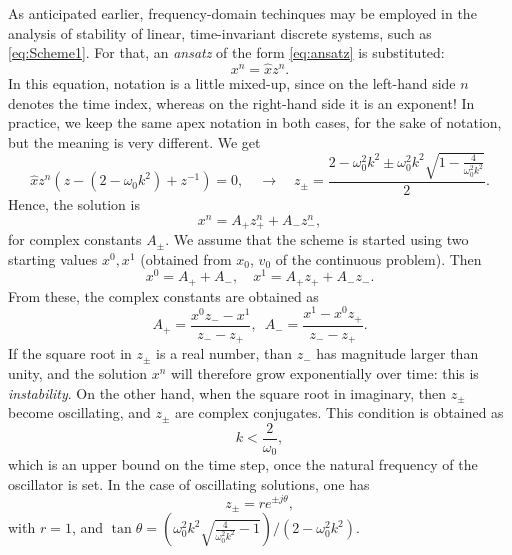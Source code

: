 As anticipated earlier, frequency-domain techinques may be employed in the analysis of stability of linear, time-invariant discrete systems, such as \eqref{eq:Scheme1}. For that, an \emph{ansatz} of the form \eqref{eq:ansatz} is substituted:
\begin{equation}
    x^n = \hat x z^{n}.
\end{equation}
In this equation, notation is a little mixed-up, since on the left-hand side $n$ denotes the time index, whereas on the right-hand side it is an exponent! In practice, we keep the same apex notation in both cases, for the sake of notation, but the meaning is very different. We get
\begin{equation}
    \hat x z^n\left( z - (2-\omega_0 k^2) + z^{-1}\right) = 0, \quad \rightarrow \quad z_{\pm} = \frac{2 - \omega_0^2 k^2 \pm \omega_0^2 k^2\sqrt{1 - \frac{4}{\omega_0^2 k^2}}}{2}.
\end{equation}
Hence, the solution is
\begin{equation}\label{eq:sol_z_SHO}
    x^n =  A_+ z^n_+ + A_- z^n_-,
\end{equation}
for complex constants $A_\pm$. We assume that the scheme is started using two starting values $x^0, x^1$ (obtained from $x_0$, $v_0$ of the continuous problem). Then
\begin{equation}
    x^0 = A_+ + A_-, \quad x^1 = A_+ z_+ + A_- z_-.
\end{equation}
From these, the complex constants are obtained as
\begin{equation}\label{eq:ApAm}
    A_+ = \frac{x^0z_- - x^1}{z_- - z_+},\,\,\, A_- = \frac{x^1 - x^0z_+ }{z_- - z_+}.
\end{equation}
If the square root in $z_\pm$ is a real number, than $z_-$ has magnitude larger than unity, and the solution $x^n$ will therefore grow exponentially over time: this is \emph{instability}. On the other hand, when the square root in imaginary, then $z_\pm$ become oscillating, and $z_\pm$ are complex conjugates. This condition is obtained as
\begin{equation}\label{eq:StabCondSHO}
    k < \frac{2}{\omega_0}, 
\end{equation}
which is an upper bound on the time step, once the natural frequency of the oscillator is set. In the case of oscillating solutions, one has
\begin{equation}
    z_\pm = r e^{\pm j \theta},
\end{equation}
with $r = 1$, and $\tan\theta = \left(\omega_0^2k^2\sqrt{\frac{4}{\omega_0^2 k^2}-1}\right)/(2-\omega_0^2 k^2)$.

